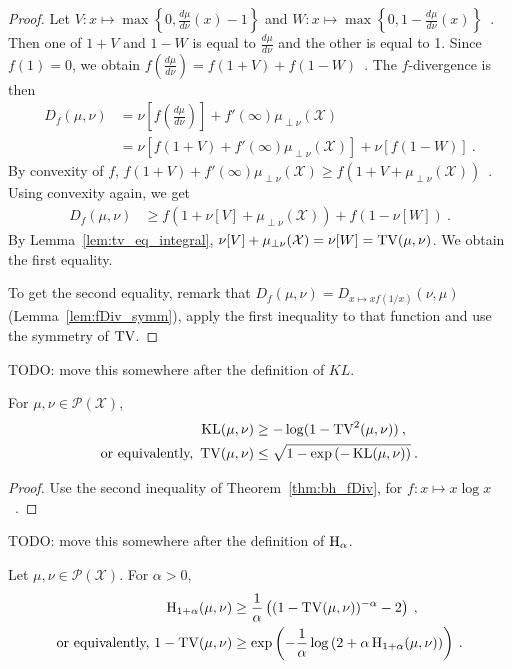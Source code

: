\begin{proof}\leanok
{}
Let $V: x \mapsto \max\left\{0, \frac{d\mu}{d\nu}(x) - 1\right\}$ and $W: x \mapsto \max\left\{0, 1 - \frac{d\mu}{d\nu}(x)\right\}$~.
Then one of $1+V$ and $1-W$ is equal to $\frac{d\mu}{d\nu}$ and the other is equal to 1.
Since $f(1) = 0$, we obtain $f(\frac{d\mu}{d\nu}) = f(1+V) + f(1-W)$~.
The $f$-divergence is then
\begin{align*}
D_f(\mu, \nu)
&= \nu[f(\frac{d\mu}{d\nu})] + f'(\infty)\mu_{\perp \nu}(\mathcal X)
\\
&= \nu\left[f(1+V) + f'(\infty)\mu_{\perp \nu}(\mathcal X)\right] + \nu\left[f(1 - W)\right]
\: .
\end{align*}
By convexity of $f$, $f(1+V) + f'(\infty)\mu_{\perp \nu}(\mathcal X) \ge f(1+V + \mu_{\perp \nu}(\mathcal X))$~. Using convexity again, we get
\begin{align*}
D_f(\mu, \nu)
&\ge f(1+ \nu[V] + \mu_{\perp \nu}(\mathcal X)) + f(1 - \nu[W])
\: .
\end{align*}
By Lemma~\ref{lem:tv_eq_integral}, $\nu[V] + \mu_{\perp \nu}(\mathcal X) = \nu[W] = \operatorname{TV}(\mu, \nu)$. We obtain the first equality.

To get the second equality, remark that $D_f(\mu, \nu) = D_{x\mapsto xf(1/x)}(\nu, \mu)$ (Lemma~\ref{lem:fDiv_symm}), apply the first inequality to that function and use the symmetry of $\operatorname{TV}$.
\end{proof}

\begin{corollary}
  \label{cor:bh_kl}
  \leanok
  TODO: move this somewhere after the definition of $KL$.

  For $\mu, \nu \in \mathcal P(\mathcal X)$,
  \begin{align*}
  \operatorname{KL}(\mu, \nu)
  &\ge - \log(1 - \operatorname{TV}^2(\mu, \nu))
  \: , \\
  \text{or equivalently, }
  \operatorname{TV}(\mu, \nu)
  &\le \sqrt{1 - \exp\left(-\operatorname{KL}(\mu, \nu) \right)}
  \: .
  \end{align*}
\end{corollary}

\begin{proof}\leanok
{}
Use the second inequality of Theorem~\ref{thm:bh_fDiv}, for $f: x \mapsto x \log x$~.
\end{proof}

\begin{corollary}
  \label{cor:cor:bh_hellingerAlpha}
  TODO: move this somewhere after the definition of $\operatorname{H}_\alpha$.

  Let $\mu, \nu \in \mathcal P(\mathcal X)$. For $\alpha > 0$,
  \begin{align*}
  \operatorname{H}_{1+\alpha}(\mu, \nu)
  &\ge \frac{1}{\alpha} \left( (1 - \operatorname{TV}(\mu, \nu))^{-\alpha} - 2 \right)
  \: , \\
  \text{or equivalently, }
  1 - \operatorname{TV}(\mu, \nu)
  &\ge \exp\left(-\frac{1}{\alpha} \log \left( 2 + \alpha \operatorname{H}_{1+\alpha}(\mu, \nu) \right)\right)
  \: .
  \end{align*}
\end{corollary}

